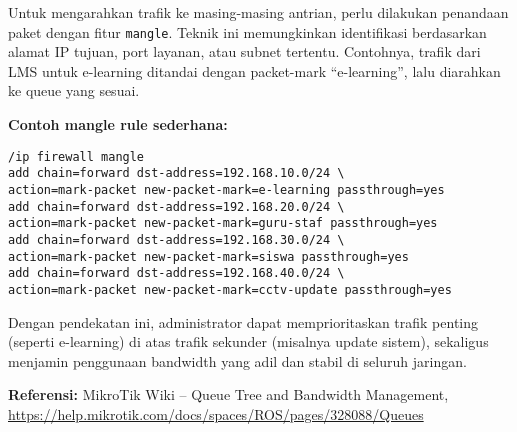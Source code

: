 \begin{enumerate}
    Untuk mengarahkan trafik ke masing-masing antrian, perlu dilakukan penandaan paket dengan fitur \texttt{mangle}. Teknik ini memungkinkan identifikasi berdasarkan alamat IP tujuan, port layanan, atau subnet tertentu. Contohnya, trafik dari LMS untuk e-learning ditandai dengan packet-mark “e-learning”, lalu diarahkan ke queue yang sesuai.

    \textbf{Contoh mangle rule sederhana:}
    \begin{verbatim}
/ip firewall mangle
add chain=forward dst-address=192.168.10.0/24 \
action=mark-packet new-packet-mark=e-learning passthrough=yes
add chain=forward dst-address=192.168.20.0/24 \
action=mark-packet new-packet-mark=guru-staf passthrough=yes
add chain=forward dst-address=192.168.30.0/24 \
action=mark-packet new-packet-mark=siswa passthrough=yes
add chain=forward dst-address=192.168.40.0/24 \
action=mark-packet new-packet-mark=cctv-update passthrough=yes
    \end{verbatim}

    Dengan pendekatan ini, administrator dapat memprioritaskan trafik penting (seperti e-learning) di atas trafik sekunder (misalnya update sistem), sekaligus menjamin penggunaan bandwidth yang adil dan stabil di seluruh jaringan.

    \textbf{Referensi:} MikroTik Wiki – Queue Tree and Bandwidth Management,\\ \url{https://help.mikrotik.com/docs/spaces/ROS/pages/328088/Queues}
\end{enumerate}
